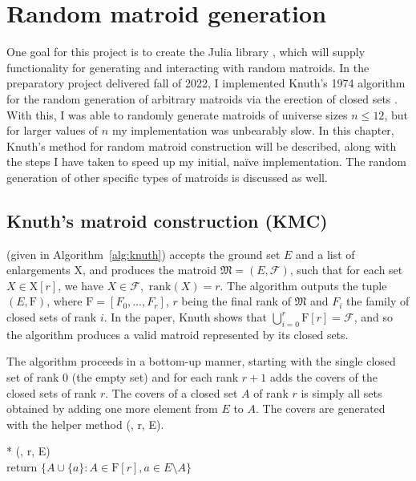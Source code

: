 \chapter{Random matroid generation}

One goal for this project is to create the Julia library , which will supply functionality for generating and interacting with random matroids. In the preparatory project delivered fall of 2022, I implemented Knuth's 1974 algorithm for the random generation of arbitrary matroids via the erection of closed sets \cite{knuth-1975}. With this, I was able to randomly generate matroids of universe sizes $n \leq 12$, but for larger values of $n$ my implementation was unbearably slow. In this chapter, Knuth's method for random matroid construction will be described, along with the steps I have taken to speed up my initial, naïve implementation. The random generation of other specific types of matroids is discussed as well.

\section{Knuth's matroid construction (KMC)}
 (given in Algorithm~\ref{alg:knuth}) accepts the ground set $E$ and a list of enlargements $\mathrm{X}$, and produces the matroid $\mathfrak{M} = (E, \mathcal{F})$, such that for each set $X \in \mathrm{X}[r]$, we have $X \in \mathcal{F}, \text{ rank}(X) = r$. The algorithm outputs the tuple $(E, \mathrm{F})$, where $\mathrm{F} = [F_0, \ldots, F_r]$, $r$ being the final rank of $\mathfrak{M}$ and $F_i$ the family of closed sets of rank $i$. In the paper, Knuth shows that $\bigcup_{i=0}^r \mathrm{F}[r] = \mathcal{F}$, and so the algorithm produces a valid matroid represented by its closed sets.

The algorithm proceeds in a bottom-up manner, starting with the single closed set of rank 0 (the empty set) and for each rank $r+1$ adds the covers of the closed sets of rank $r$. The covers of a closed set $A$ of rank $r$ is simply all sets obtained by adding one more element from $E$ to $A$. The covers are generated with the helper method (, r, E).

\begin{tcolorbox}
  \begin{pseudo}*
    (, r, E) \\
    return $\{ A \cup \{a\} : A \in \mathrm{F}[r], a \in E \setminus A \}$
  \end{pseudo}
\end{tcolorbox}

